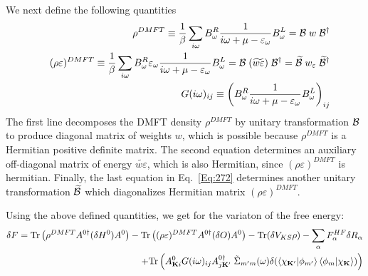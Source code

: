 \documentclass[aps,prb,floatfix,epsfig,singlecolumn,showpacs,preprintnumbers]{revtex4}
\newcommand{\vK}{{\mathbf{K}}}
\newcommand{\Tr}{\mathrm{Tr}}
\newcommand{\cB}{{\cal B}}
\begin{document}
We next define the following quantities
\begin{eqnarray}
&&\rho^{DMFT} \equiv \frac{1}{\beta}\sum_{i\omega} B^R_\omega \frac{1}{i\omega+\mu-\varepsilon_\omega}B^L_\omega
= \cB\; w\; \cB^\dagger
\label{Eq:271}\\
&&(\rho\varepsilon)^{DMFT} \equiv  \frac{1}{\beta}\sum_{i\omega} B^R_\omega\varepsilon_\omega \frac{1}{i\omega+\mu-\varepsilon_\omega} B^L_\omega 
= \cB\;   (\widetilde{w\varepsilon})\; \cB^\dagger =
\widetilde{\cB}\; w_\varepsilon \;\widetilde{\cB}^\dagger 
\label{Eq:272}\\
&& G(i\omega)_{ij} \equiv \left(B^R_\omega\frac{1}{i\omega+\mu-\varepsilon_\omega} B^L_\omega\right)_{ij} 
\label{Eq:273}
\end{eqnarray}
The first line decomposes the DMFT density $\rho^{DMFT}$ by unitary
transformation $\cB$ to produce diagonal matrix of weights $w$, which
is possible because $\rho^{DMFT}$ is a Hermitian positive definite
matrix. The second equation determines an auxiliary off-diagonal matrix of energy
$\widetilde{w\varepsilon}$, which is also Hermitian,  since
$(\rho\varepsilon)^{DMFT}$ is hermitian. Finally, the last equation in
Eq.~\ref{Eq:272} determines another unitary transformation
$\widetilde{\cB}$ which diagonalizes Hermitian matrix $(\rho\varepsilon)^{DMFT}$.


Using the above defined quantities, we get for the variaton of the free energy:
\begin{eqnarray}
\delta F = 
\Tr\left( \rho^{DMFT} A^{0\dagger}(\delta  H^0)A^0 \right)
-\Tr\left( (\rho\varepsilon)^{DMFT} A^{0\dagger}(\delta  O) A^0 \right) 
- \Tr(\delta V_{KS}\rho) -\sum_\alpha F^{HF}_\alpha \delta R_\alpha 
\nonumber\\
+\Tr\left(A^0_{\vK i}  G(i\omega)_{ij}  A^{0\dagger}_{j\vK'}
\;\tilde{\Sigma}_{m'm}(\omega)
\delta(\braket{\chi_{\vK'}|\phi_{m'}}\braket{\phi_{m}|\chi_\vK})\right)
\label{Eq:274}
\end{eqnarray}
\end{document}
